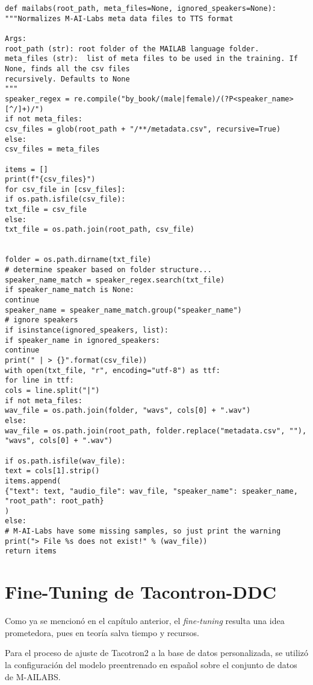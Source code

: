 \lstset{language=Python}
\lstset{frame=lines}
\lstset{basicstyle=\footnotesize}
\begin{lstlisting}
def mailabs(root_path, meta_files=None, ignored_speakers=None):
"""Normalizes M-AI-Labs meta data files to TTS format

Args:
root_path (str): root folder of the MAILAB language folder.
meta_files (str):  list of meta files to be used in the training. If None, finds all the csv files
recursively. Defaults to None
"""
speaker_regex = re.compile("by_book/(male|female)/(?P<speaker_name>[^/]+)/")
if not meta_files:
csv_files = glob(root_path + "/**/metadata.csv", recursive=True)
else:
csv_files = meta_files

items = []
print(f"{csv_files}")
for csv_file in [csv_files]:
if os.path.isfile(csv_file):
txt_file = csv_file
else:
txt_file = os.path.join(root_path, csv_file)


folder = os.path.dirname(txt_file)
# determine speaker based on folder structure...
speaker_name_match = speaker_regex.search(txt_file)
if speaker_name_match is None:
continue
speaker_name = speaker_name_match.group("speaker_name")
# ignore speakers
if isinstance(ignored_speakers, list):
if speaker_name in ignored_speakers:
continue
print(" | > {}".format(csv_file))
with open(txt_file, "r", encoding="utf-8") as ttf:
for line in ttf:
cols = line.split("|")
if not meta_files:
wav_file = os.path.join(folder, "wavs", cols[0] + ".wav")
else:
wav_file = os.path.join(root_path, folder.replace("metadata.csv", ""), "wavs", cols[0] + ".wav")

if os.path.isfile(wav_file):
text = cols[1].strip()
items.append(
{"text": text, "audio_file": wav_file, "speaker_name": speaker_name, "root_path": root_path}
)
else:
# M-AI-Labs have some missing samples, so just print the warning
print("> File %s does not exist!" % (wav_file))
return items
\end{lstlisting}

\section{Fine-Tuning de Tacontron-DDC} \label{tacotron2}
Como ya se mencionó en el capítulo anterior, el \textit{fine-tuning} resulta una idea prometedora, pues en teoría salva tiempo y recursos.

Para el proceso de ajuste de Tacotron2 a la base de datos personalizada, se utilizó la configuración del modelo preentrenado en español sobre el conjunto de datos de M-AILABS. 

